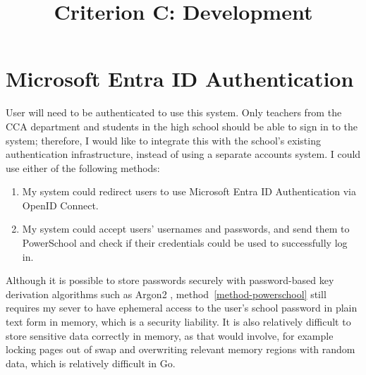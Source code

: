 

\usepackage{nameref}
\usepackage{xr}

\newcommand{\fileref}[1]{\texttt{\nameref*{#1}} (appendix page~\pageref*{#1})}
\newcommand{\coderef}[1]{(appendix page~\pageref*{#1})}
\newcommand{\codenref}[1]{\texttt{#1} (appendix page~\pageref*{#1})}

\usepackage[]{tikz}
\usetikzlibrary{arrows.meta, positioning}

\title{Criterion C: Development}


\maketitle

\renewcommand{\contentsname}{List of Techniques}
\tableofcontents

\section{Microsoft Entra ID Authentication}

User will need to be authenticated to use this system. Only teachers from the CCA department and students in the high school should be able to sign in to the system; therefore, I would like to integrate this with the school's existing authentication infrastructure, instead of using a separate accounts system. I could use either of the following methods:

\begin{enumerate}
	\item \label{method-entra} My system could redirect users to use Microsoft Entra ID Authentication via OpenID Connect.
	\item \label{method-powerschool} My system could accept users' usernames and passwords, and send them to PowerSchool and check if their credentials could be used to successfully log in.
\end{enumerate}

Although it is possible to store passwords securely with password-based key derivation algorithms such as Argon2 \parencite{argon2}, method~\ref{method-powerschool} still requires my sever to have ephemeral access to the user's school password in plain text form in memory, which is a security liability. It is also relatively difficult to store sensitive data correctly in memory, as that would involve, for example locking pages out of swap and overwriting relevant memory regions with random data, which is relatively difficult in Go.

